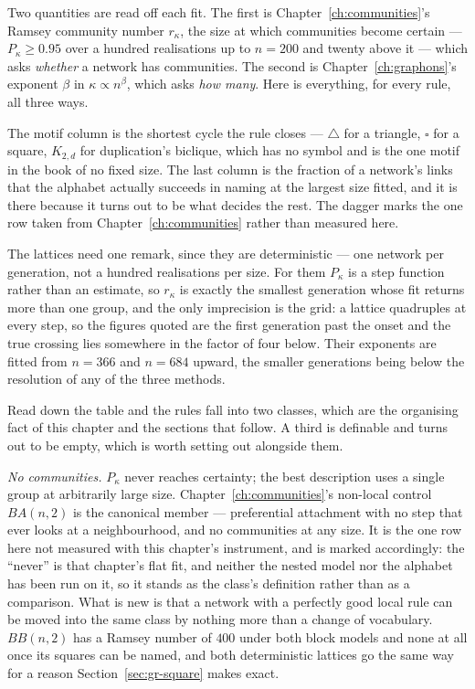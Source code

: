 \noindent Two quantities are read off each fit. The first is
Chapter~\ref{ch:communities}'s Ramsey community number $r_\kappa$, the size at
which communities become certain --- $P_\kappa\ge0.95$ over a hundred
realisations up to $n=200$ and twenty above it --- which asks \emph{whether} a
network has communities. The second is Chapter~\ref{ch:graphons}'s exponent
$\beta$ in $\kappa\propto n^{\beta}$, which asks \emph{how many}. Here is
everything, for every rule, all three ways.



\noindent The motif column is the shortest cycle the rule closes --- $\triangle$
for a triangle, $\square$ for a square, $K_{2,d}$ for duplication's biclique,
which has no symbol and is the one motif in the book of no fixed size. The last
column is the fraction of a network's links that the alphabet actually succeeds
in naming at the largest size fitted, and it is there because it turns out to be
what decides the rest. The dagger marks the one row taken from
Chapter~\ref{ch:communities} rather than measured here.

The lattices need one remark, since they are deterministic --- one network per
generation, not a hundred realisations per size. For them $P_\kappa$ is a step
function rather than an estimate, so $r_\kappa$ is exactly the smallest
generation whose fit returns more than one group, and the only imprecision is the
grid: a lattice quadruples at every step, so the figures quoted are the first
generation past the onset and the true crossing lies somewhere in the factor of
four below. Their exponents are fitted from $n=366$ and $n=684$ upward, the
smaller generations being below the resolution of any of the three methods.

Read down the table and the rules fall into two classes, which are the organising
fact of this chapter and the sections that follow. A third is definable and turns
out to be empty, which is worth setting out alongside them.

\emph{No communities.} $P_\kappa$ never reaches certainty; the best description
uses a single group at arbitrarily large size. Chapter~\ref{ch:communities}'s
non-local control $BA(n,2)$ is the canonical member --- preferential attachment
with no step that ever looks at a neighbourhood, and no communities at any size.
It is the one row here not measured with this chapter's instrument, and is marked
accordingly: the ``never'' is that chapter's flat fit, and neither the nested
model nor the alphabet has been run on it, so it stands as the class's definition
rather than as a comparison. What is new is that a network with a perfectly good
local rule can be moved into the same class by nothing more than a change of
vocabulary. $BB(n,2)$ has a Ramsey number of $400$ under both block models and
none at all once its squares can be named, and both deterministic lattices go the
same way for a reason Section~\ref{sec:gr-square} makes exact.

